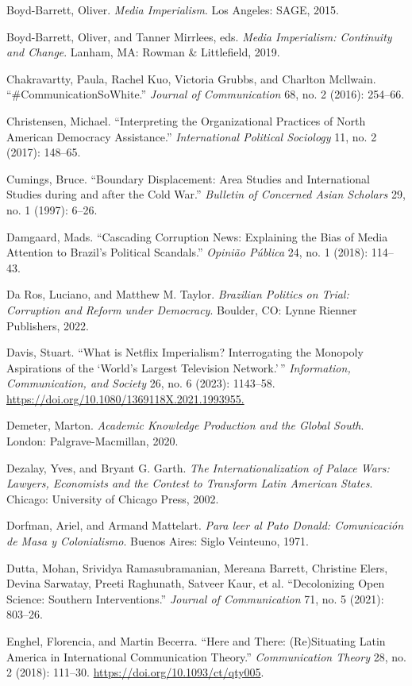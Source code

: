 \documentclass{tufte-handout}
\begin{document}
\begin{hangparas}{.25in}{1}
Boyd-Barrett, Oliver. \emph{Media Imperialism}. Los Angeles: SAGE, 2015.

Boyd-Barrett, Oliver, and Tanner Mirrlees, eds. \emph{Media Imperialism:
Continuity and Change}. Lanham, MA: Rowman \& Littlefield, 2019.

Chakravartty, Paula, Rachel Kuo, Victoria Grubbs, and Charlton Mcllwain.
``\#CommunicationSoWhite.'' \emph{Journal of Communication} 68, no. 2
(2016): 254--66.

Christensen, Michael. ``Interpreting the Organizational Practices of
North American Democracy Assistance.'' \emph{International Political
Sociology} 11, no. 2 (2017): 148--65.

Cumings, Bruce. ``Boundary Displacement: Area Studies and International
Studies during and after the Cold War.'' \emph{Bulletin of Concerned
Asian Scholars} 29, no. 1 (1997): 6--26.

Damgaard, Mads. ``Cascading Corruption News: Explaining the Bias of
Media Attention to Brazil's Political Scandals.'' \emph{Opinião Pública}
24, no. 1 (2018): 114--43.

Da Ros, Luciano, and Matthew M. Taylor. \emph{Brazilian Politics on
Trial: Corruption and Reform under Democracy}. Boulder, CO: Lynne
Rienner Publishers, 2022.

Davis, Stuart. ``What is Netflix Imperialism? Interrogating the Monopoly
Aspirations of the `World's Largest Television Network.'\,''
\emph{Information, Communication, and Society} 26, no. 6 (2023):
1143--58. \url{https://doi.org/10.1080/1369118X.2021.1993955.}

Demeter, Marton. \emph{Academic Knowledge Production and the Global
South}. London: Palgrave-Macmillan, 2020.

Dezalay, Yves, and Bryant G. Garth. \emph{The Internationalization of
Palace Wars: Lawyers, Economists and the Contest to Transform Latin
American States}. Chicago: University of Chicago Press, 2002.

Dorfman, Ariel, and Armand Mattelart. \emph{Para leer al Pato Donald:
Comunicación de Masa y Colonialismo}. Buenos Aires: Siglo Veinteuno,
1971.

Dutta, Mohan, Srividya Ramasubramanian, Mereana Barrett, Christine
Elers, Devina Sarwatay, Preeti Raghunath, Satveer Kaur, et al.
``Decolonizing Open Science: Southern Interventions.'' \emph{Journal of
Communication} 71, no. 5 (2021): 803--26.

Enghel, Florencia, and Martin Becerra. ``Here and There: (Re)Situating
Latin America in International Communication Theory.''
\emph{Communication Theory} 28, no. 2 (2018): 111--30.
\url{https://doi.org/10.1093/ct/qty005}.


\end{hangparas}
\end{document}
